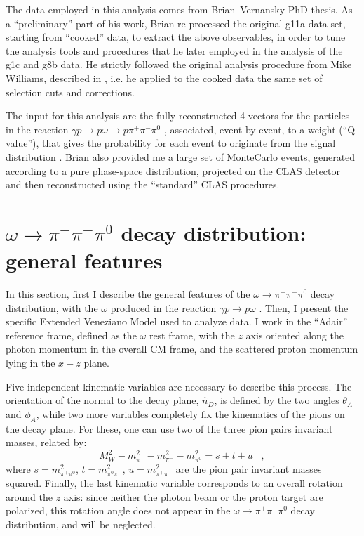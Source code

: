 \documentclass[a4paper,10pt]{report}
\newcommand{\decay}{$\omega \rightarrow \pi^+ \pi^- \pi^0$ }
\newcommand{\production}{$\gamma p \rightarrow p \omega$ }
\newcommand{\fullreaction}{$\gamma p \rightarrow p \omega \rightarrow p \pi^+ \pi^- \pi^{0}$ }
\begin{document}
The data employed in this analysis comes from Brian~Vernansky PhD thesis.
As a ``preliminary'' part of his work, Brian re-processed the original g11a data-set, starting from ``cooked'' data, to extract the above observables,
in order to tune the analysis tools and procedures that he later employed in the analysis of the g1c and g8b data. He strictly followed the original analysis procedure from Mike Williams, described in 
\cite{Williams:thesis}, i.e. he applied to the cooked data the same set of selection cuts and corrections.

The input for this analysis are the fully reconstructed 4-vectors for the particles in the reaction \fullreaction, associated, event-by-event, 
to a weight (``Q-value''), that gives the probability for each event to originate from the signal distribution \cite{Williams:2008ac}. 
Brian also provided me a large set of MonteCarlo events, generated according to a pure phase-space distribution, projected on the CLAS detector and then reconstructed using the ``standard'' CLAS procedures. 


\section{\decay decay distribution: general features}
In this section, first I describe the general features of the \decay decay distribution, with the $\omega$ produced in the reaction \production.
Then, I present the specific Extended Veneziano Model used to analyze data.
I work in the ``Adair'' reference frame, defined as the $\omega$ rest frame, with the $z$ axis oriented along the photon momentum in the overall CM frame, and the scattered proton momentum lying in the $x-z$ plane.

Five independent kinematic variables are necessary to describe this process. The orientation of the normal to the decay plane, $\hat{n}_D$, is defined by the two angles $\theta_A$ and $\phi_A$, while two more variables completely fix the kinematics
of the pions on the decay plane. For these, one can use two of the three pion pairs invariant masses, related by:
\begin{equation}
M_W^2-m^2_{\pi^+} -m^2_{\pi^-} - m^2_{\pi^0} = s + t + u \; \; \; ,
\end{equation}
where $s=m^2_{\pi^+ \pi^0}$, $t=m^2_{\pi^0 \pi^-}$, $u=m^2_{\pi^+ \pi^-}$ are the pion pair invariant masses squared. Finally, the last kinematic variable corresponds to an overall rotation around the $z$ axis: since neither the photon beam or the proton target are polarized,
this rotation angle does not appear in the \decay decay distribution, and will be neglected.
\end{document}
